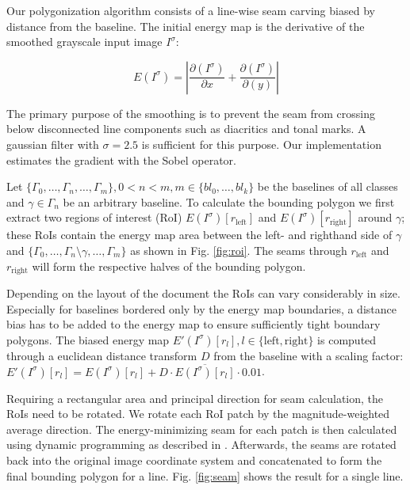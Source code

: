 Our polygonization algorithm consists of a line-wise seam carving
\cite{avidan2007seam} biased by distance from the baseline. The initial energy
map is the derivative of the smoothed grayscale input image $I^\sigma$:

\begin{equation*}
	E(I^\sigma) = \left\vert\frac{\partial(I^\sigma)}{\partial x} + \frac{\partial(I^\sigma)}{\partial(y)}\right\vert
\end{equation*}

The primary purpose of the smoothing is to prevent the seam from crossing below
disconnected line components such as diacritics and tonal marks. A gaussian
filter with $\sigma = 2.5$ is sufficient for this purpose. Our implementation
estimates the gradient with the Sobel operator.

Let $\{\Gamma_0, \dots, \Gamma_n, \dots, \Gamma_m\}, 0 < n < m, m \in \{bl_0,
\dots, bl_k\}$ be the baselines of all classes and $\gamma \in \Gamma_n$ be an
arbitrary baseline. To calculate the bounding polygon we first extract two
regions of interest (RoI) $E(I^\sigma)[r_\text{left}]$ and $E(I^\sigma)[r_\text{right}]$
around $\gamma$; these RoIs contain the energy map area between the left- and
righthand side of $\gamma$ and $\{\Gamma_0, \dots, \Gamma_n \setminus \gamma,
\dots, \Gamma_m\}$ as shown in Fig. \ref{fig:roi}.  The seams through
$r_\text{left}$ and $r_\text{right}$ will form the respective halves of the bounding
polygon. 

Depending on the layout of the document the RoIs can vary considerably in size.
Especially for baselines bordered only by the energy map boundaries, a distance
bias has to be added to the energy map to ensure sufficiently tight boundary
polygons. The biased energy map $E'(I^\sigma)[r_l], l \in \{\text{left}, \text{right}\}$ is
computed through a euclidean distance transform $D$ from the baseline with a
scaling factor: $E'(I^\sigma)[r_l] = E(I^\sigma)[r_l] +
D \cdot \overline{E(I^\sigma)[r_l]}\cdot 0.01$.  

Requiring a rectangular area and principal direction for seam calculation, the
RoIs need to be rotated. We rotate each RoI patch by the magnitude-weighted
average direction. The energy-minimizing seam for each patch is then calculated
using dynamic programming as described in \cite{avidan2007seam}. Afterwards,
the seams are rotated back into the original image coordinate system and
concatenated to form the final bounding polygon for a line. Fig. \ref{fig:seam}
shows the result for a single line.

